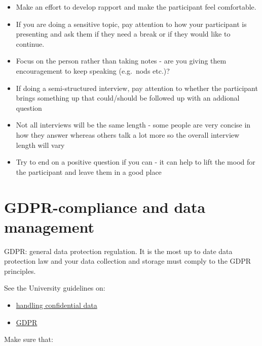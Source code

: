 \documentclass[
  english,
  letterpaper,
  DIV=11,
  numbers=noendperiod]{scrreprt}
\providecommand{\tightlist}{%
  \setlength{\itemsep}{0pt}\setlength{\parskip}{0pt}}
\begin{document}
\begin{itemize}
\tightlist
\item
  Make an effort to develop rapport and make the participant feel
  comfortable.
\item
  If you are doing a sensitive topic, pay attention to how your
  participant is presenting and ask them if they need a break or if they
  would like to continue.
\item
  Focus on the person rather than taking notes - are you giving them
  encouragement to keep speaking (e.g.~nods etc.)?
\item
  If doing a semi-structured interview, pay attention to whether the
  participant brings something up that could/should be followed up with
  an addional question
\item
  Not all interviews will be the same length - some people are very
  concise in how they answer whereas others talk a lot more so the
  overall interview length will vary
\item
  Try to end on a positive question if you can - it can help to lift the
  mood for the participant and leave them in a good place
\end{itemize}

\section{GDPR-compliance and data
management}\label{gdpr-compliance-and-data-management}

GDPR: general data protection regulation. It is the most up to date data
protection law and your data collection and storage must comply to the
GDPR principles.

See the University guidelines on:

\begin{itemize}
\tightlist
\item
  \href{https://www.gla.ac.uk/myglasgow/it/informationsecurity/confidentialdata/}{handling
  confidential data}\\
\item
  \href{https://www.gla.ac.uk/myglasgow/dpfoioffice/gdpr/}{GDPR}
\end{itemize}

Make sure that:
\end{document}
